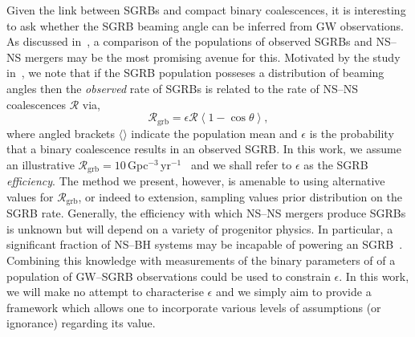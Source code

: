 \documentclass[twocolumn]{aastex61}
\newcommand{\grbrate}{{{\mathcal R}_{\mathrm{grb}}}}
\newcommand{\cbcrate}{{{\mathcal R}}}
\newcommand{\BNS}{\ac{NS}--\ac{NS}\xspace}
\newcommand{\NSBH}{\ac{NS}--\ac{BH}\xspace}
\newcommand{\JOINT}{\ac{GW}--\ac{SGRB}\xspace}
\begin{document}
Given the link between \acp{SGRB} and compact binary coalescences, it is
interesting to ask whether the \ac{SGRB} beaming angle can be inferred from
\ac{GW} observations. As discussed in~\cite{Clark:2014jpa}, a comparison of
the populations of observed \acp{SGRB} and \BNS mergers may be the most
promising avenue for this. Motivated by the study in~\cite{Chen:2012qh},
we note that if the \ac{SGRB} population posseses a distribution of beaming
angles then the \emph{observed} rate of \acp{SGRB} is related to the rate of
\BNS coalescences $\cbcrate$ via,
%
\begin{equation}\label{eq:rate2angle}
    \grbrate = \epsilon\cbcrate \left \langle 1-\cos \theta \right \rangle,
\end{equation}
%
where angled brackets $\langle \rangle$ indicate the population mean
and $\epsilon$ is the probability that a binary coalescence results in
an observed \ac{SGRB}.  In this work, we assume an illustrative
$\grbrate=10$\,Gpc$^{-3}$\,yr$^{-1}$~\cite{Nakar:2007yr,Dietz:2010eh}
and we shall refer to $\epsilon$ as the \ac{SGRB}
\emph{efficiency}. The method we present, however, is amenable to
using alternative values for $\grbrate$, or indeed to extension,
sampling values prior distribution on the \ac{SGRB} rate.  Generally,
the efficiency with which \BNS mergers produce \acp{SGRB} is unknown
but will depend on a variety of progenitor physics.  In particular, a
significant fraction of \NSBH systems may be incapable of powering an
\ac{SGRB}~\cite{Pannarale:2014rea}.  Combining this knowledge with
measurements of the binary parameters of of a population of \JOINT
observations could be used to constrain $\epsilon$.  In this work, we
will make no attempt to characterise $\epsilon$ and we simply aim to
provide a framework which allows one to incorporate various levels of
assumptions (or ignorance) regarding its value.
\end{document}

